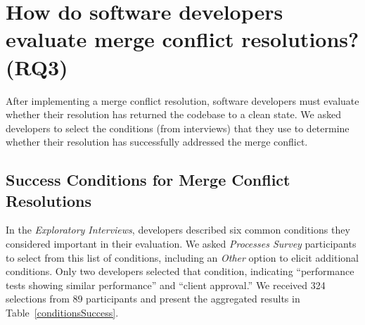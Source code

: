
\section{How do software developers \textbf{evaluate} merge conflict resolutions? (RQ3)}\label{RQ3}

After implementing a merge conflict resolution, software developers must evaluate whether their resolution has returned the codebase to a clean state.
We asked developers to select the conditions (from interviews) that they use to determine whether their resolution has successfully addressed the merge conflict.

\subsection{Success Conditions for Merge Conflict Resolutions}

In the \textit{Exploratory Interviews}, developers described six common conditions they considered important in their evaluation.
We asked \textit{Processes Survey} participants to select from this list of conditions, including an \textit{Other} option to elicit additional conditions.
Only two developers selected that condition, indicating ``performance tests showing similar performance'' and ``client approval.''
We received 324 selections from 89 participants and present the aggregated results in Table~\ref{conditionsSuccess}.

